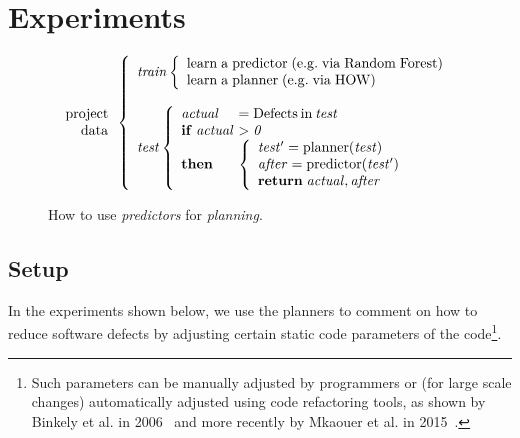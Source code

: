 \documentclass{sig-alternate}
\begin{document}
\section{Experiments}

  
\begin{figure}[!t]
\small 
\[
\begin{array}{r}
\mathrm{project}\\
\mathrm{data}
\end{array} 
\left\{\begin{array}{l}\mathit{train}
        \left\{\begin{array}{l}
                \mathrm{learn\;a\;}\mathrm{predictor\;}\mathrm{(e.g.\;via \;Random\;Forest)}\\
                \mathrm{learn\;a\;}\mathrm{planner\;}\mathrm{(e.g.\;via \; HOW)}
              \end{array}\right.
       \\
      ~\\
\mathit{test}  
    \left\{\begin{array}{l@{~}l}
           \mathit{actual}& =\mathrm{Defects \hspace{2pt} in \hspace{2pt}}\mathit{test}\\
           \mathrm{\bf if\;}\mathit{actual} & >  \mathit{0}\\
           \mathrm{\bf then} &
           \left\{
            \begin{array}{l}
                \mathit{test'} = \mathrm{planner}(\mathit{test})\\
                \mathit{after} =\mathrm{predictor}(\mathit{test'})\\ 
                \mathrm{{\bf return}\;} \mathit{actual},\mathit{after}
            \end{array}
          \right.
   \end{array}\right.
\end{array} \right. 
\]
 
\caption{How to use {\em predictors} for {\em planning}.}\label{fig:work}
\end{figure}


\subsection{Setup}

In the experiments shown below,  we use the planners to comment on how to reduce
software defects by adjusting certain static code parameters of the code\footnote{Such parameters can be manually adjusted by programmers or (for large scale changes) automatically adjusted using code refactoring
tools, as shown by Binkely et al. in 2006~\cite{Binkley2006} and more recently by Mkaouer et al. in 2015~\cite{Mkaouer15}.}.
\end{document}
